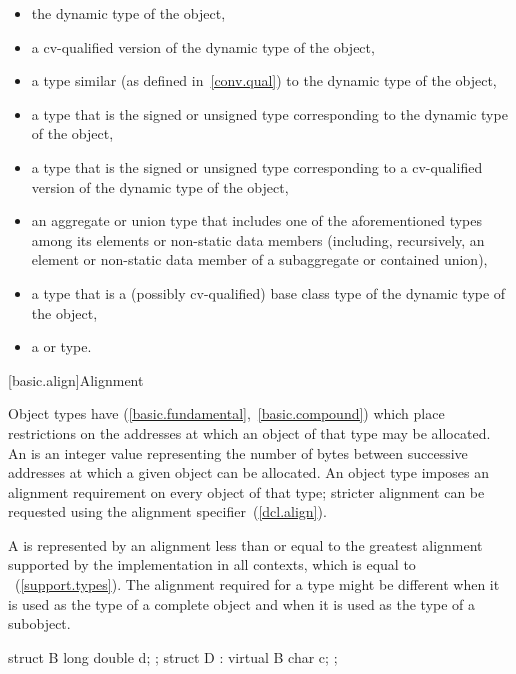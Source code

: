 \begin{itemize}
\item the dynamic type of the object,

\item a cv-qualified version of the dynamic type of the object,

\item a type similar (as defined in~\ref{conv.qual}) to the dynamic type
of the object,

\item a type that is the signed or unsigned type corresponding to the
dynamic type of the object,

\item a type that is the signed or unsigned type corresponding to a
cv-qualified version of the dynamic type of the object,

\item an aggregate or union type that includes one of the aforementioned types among its
elements or non-static data members (including, recursively, an element or non-static data member of a
subaggregate or contained union),

\item a type that is a (possibly cv-qualified) base class type of the dynamic type of
the object,

\item a  or   type.
\end{itemize}

[basic.align]{Alignment}

\pnum
{}%
Object types have  (\ref{basic.fundamental},~\ref{basic.compound})
which place restrictions on the addresses at which an object of that type
may be allocated. An  is an 
integer value representing the number of bytes between successive addresses
at which a given object can be allocated. An object type imposes an alignment
requirement on every object of that type; stricter alignment can be requested
using the alignment specifier~(\ref{dcl.align}).

\pnum
{}%
%
A  is represented by an alignment
less than or equal to the greatest alignment supported by the implementation in
all contexts, which is equal to
~(\ref{support.types}).
The alignment required for a type might be different when it is used as the type
of a complete object and when it is used as the type of a subobject. \enterexample
\begin{codeblock}
struct B { long double d; };
struct D : virtual B { char c; };
\end{codeblock}

